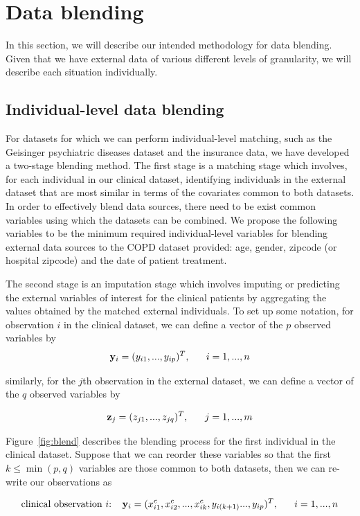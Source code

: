 \documentclass{article}
\begin{document}
\section{Data blending}
In this section, we will describe our intended methodology for data blending. 
Given that we have external data of various different levels of granularity, 
we will describe each situation individually.


\subsection{Individual-level data blending}

For datasets for which we can perform individual-level matching, such as the Geisinger psychiatric diseases dataset and the insurance data, we have developed a two-stage blending method. The first stage is a matching stage which involves, for each individual in our clinical dataset, identifying individuals in the external dataset that are most similar in terms of the covariates common to both datasets. In order to effectively blend data sources, there need to be exist common variables using which the datasets can be combined. We propose the following variables to be the minimum required individual-level variables for blending external data sources to the COPD dataset provided: age, gender, zipcode (or hospital zipcode) and the date of patient treatment.

The second stage is an imputation stage which involves imputing or predicting the external variables of interest for the clinical patients by aggregating the values obtained by the matched external individuals. To set up some notation, for observation $i$ in the clinical dataset, we can define a vector of the $p$ observed variables by
$${\bf y}_i = (y_{i1}, ..., y_{ip})^T, ~~~~~ i = 1, ..., n$$

similarly, for the $j$th observation in the external dataset, we can define a vector of the $q$ observed variables by

$${\bf z}_j = (z_{j1}, ..., z_{jq})^T, ~~~~~ j = 1, ..., m$$

Figure~\ref{fig:blend} describes the blending process for the first individual in the clinical dataset. Suppose that we can reorder these variables so that the first $k \leq \min(p,q)$ variables are those common to both datasets, then we can re-write our observations as

$$\text{clinical observation $i$: } ~~{\bf y}_i = (x^c_{i1}, x^c_{i2}, ..., x^c_{ik}, y_{i(k+1)} ..., y_{ip})^T, ~~~~~ i = 1, ..., n$$
\end{document}
